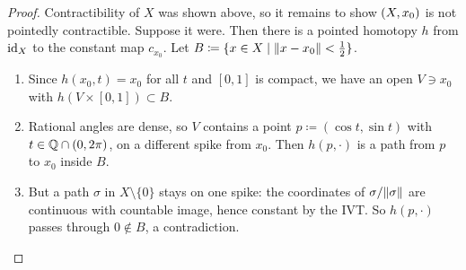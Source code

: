 \begin{proof}
  Contractibility of $X$ was shown above, so it remains to show $\left(X,x_0\right)$ is not pointedly contractible. Suppose it were. Then there is a pointed homotopy $h$ from $\operatorname{id}_X$ to the constant map $c_{x_0}$. Let $B\coloneqq\{x\in X\mid\lVert x-x_0\rVert<\tfrac12\}$.
  \begin{enumerate}
    \item Since $h(x_0,t)=x_0$ for all $t$ and $[0,1]$ is compact, we have an open $V\ni x_0$ with $h(V\times[0,1])\subset B$.
    \item Rational angles are dense, so $V$ contains a point $p\coloneqq(\cos t,\sin t)$ with $t\in\mathbb{Q}\cap(0,2\pi)$, on a different spike from $x_0$. Then $h(p,\cdot)$ is a path from $p$ to $x_0$ inside $B$.
    \item But a path $\sigma$ in $X\setminus\{0\}$ stays on one spike: the coordinates of $\sigma/\lVert\sigma\rVert$ are continuous with countable image, hence constant by the IVT. So $h(p,\cdot)$ passes through $0\notin B$, a contradiction.
  \end{enumerate}
\end{proof}

